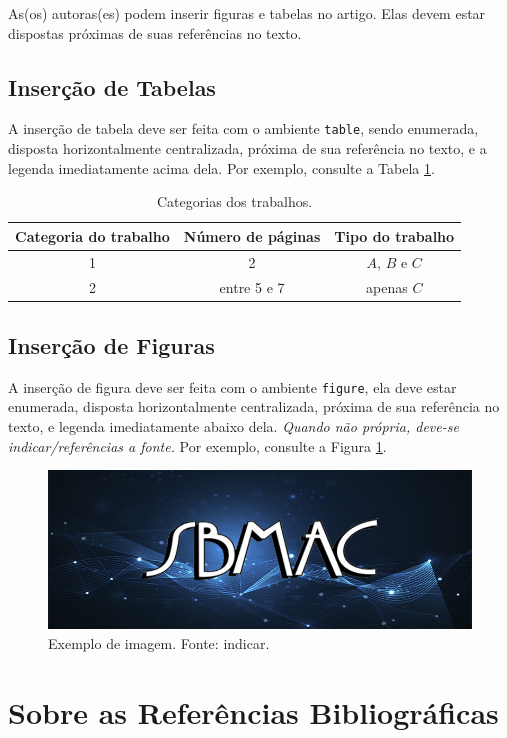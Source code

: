 \documentclass{pssbmac}
\begin{document}
As(os) autoras(es) podem inserir figuras e tabelas no artigo. Elas devem estar dispostas próximas de suas referências no texto.

\subsection{Inserção de Tabelas}

A inserção de tabela deve ser feita com o ambiente \verb!table!, sendo enumerada, disposta horizontalmente centralizada, próxima de sua referência no texto, e a legenda imediatamente acima dela. Por exemplo, consulte a Tabela \ref{tabela01}.

\begin{table}[H]
\caption{ {\small Categorias dos trabalhos.}}
\centering
\begin{tabular}{ccc}
\hline
Categoria do trabalho  & Número de páginas & Tipo do trabalho\\ \hline
1          & 2  & $A$, $B$ e $C$    \\
2          & entre 5 e 7  & apenas $C$ \\
\hline
\end{tabular}\label{tabela01}
\end{table}

\subsection{Inserção de Figuras}

A inserção de figura deve ser feita com o ambiente \verb!figure!, ela deve estar enumerada, disposta horizontalmente centralizada, próxima de sua referência no texto, e legenda imediatamente abaixo dela. \emph{Quando não própria, deve-se indicar/referências a fonte.} Por exemplo, consulte a Figura \ref{figura01}.

\begin{figure}[H]
\centering
\includegraphics[width=.7\textwidth]{ex_fig}
\caption{ {\small Exemplo de imagem. Fonte: indicar.}}
\label{figura01}
\end{figure}

\section{Sobre as Referências Bibliográficas}
\end{document}
